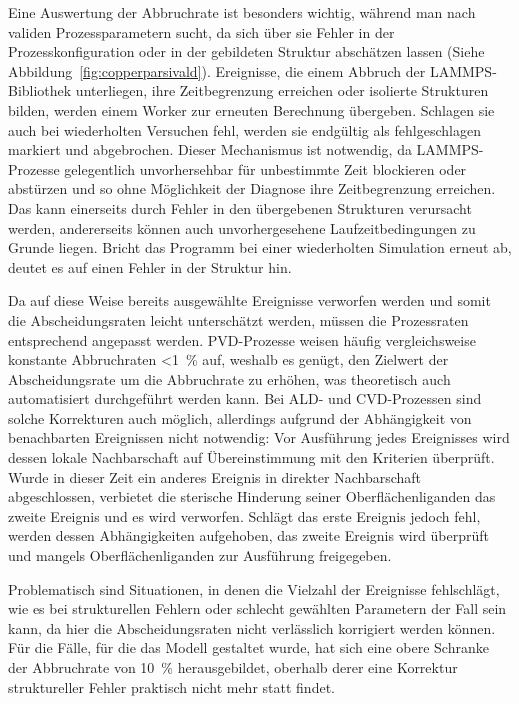 Eine Auswertung der Abbruchrate ist besonders wichtig, während man nach validen Prozessparametern sucht, da sich über sie Fehler in der Prozesskonfiguration oder in der gebildeten Struktur abschätzen lassen (Siehe Abbildung~\ref{fig:copperparsivald}).
Ereignisse, die einem Abbruch der LAMMPS-Bibliothek unterliegen, ihre Zeitbegrenzung erreichen oder isolierte Strukturen bilden, werden einem Worker zur erneuten Berechnung übergeben.
Schlagen sie auch bei wiederholten Versuchen fehl, werden sie endgültig als fehlgeschlagen markiert und abgebrochen.
Dieser Mechanismus ist notwendig, da LAMMPS-Prozesse gelegentlich unvorhersehbar für unbestimmte Zeit blockieren oder abstürzen und so ohne Möglichkeit der Diagnose ihre Zeitbegrenzung erreichen.
Das kann einerseits durch Fehler in den übergebenen Strukturen verursacht werden, andererseits können auch unvorhergesehene Laufzeitbedingungen zu Grunde liegen.
Bricht das Programm bei einer wiederholten Simulation erneut ab, deutet es auf einen Fehler in der Struktur hin.

Da auf diese Weise bereits ausgewählte Ereignisse verworfen werden und somit die Abscheidungsraten leicht unterschätzt werden, müssen die Prozessraten entsprechend angepasst werden.
PVD-Prozesse weisen häufig vergleichsweise konstante Abbruchraten \SI{<1}{\percent} auf, weshalb es genügt, den Zielwert der Abscheidungsrate um die Abbruchrate zu erhöhen, was theoretisch auch automatisiert durchgeführt werden kann.
Bei ALD- und CVD-Prozessen sind solche Korrekturen auch möglich, allerdings aufgrund der Abhängigkeit von benachbarten Ereignissen nicht notwendig:
Vor Ausführung jedes Ereignisses wird dessen lokale Nachbarschaft auf Übereinstimmung mit den Kriterien überprüft.
Wurde in dieser Zeit ein anderes Ereignis in direkter Nachbarschaft abgeschlossen, verbietet die sterische Hinderung seiner Oberflächenliganden das zweite Ereignis und es wird verworfen.
Schlägt das erste Ereignis jedoch fehl, werden dessen Abhängigkeiten aufgehoben, das zweite Ereignis wird überprüft und mangels Oberflächenliganden zur Ausführung freigegeben.

Problematisch sind Situationen, in denen die Vielzahl der Ereignisse fehlschlägt, wie es bei strukturellen Fehlern oder schlecht gewählten Parametern der Fall sein kann, da hier die Abscheidungsraten nicht verlässlich korrigiert werden können.
Für die Fälle, für die das Modell gestaltet wurde, hat sich eine obere Schranke der Abbruchrate von \SI{10}{\percent} herausgebildet, oberhalb derer eine Korrektur struktureller Fehler praktisch nicht mehr statt findet.
